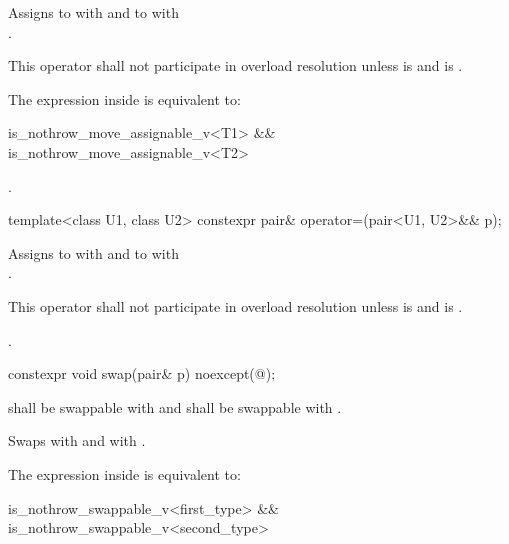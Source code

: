 \begin{itemdescr}
\pnum
\effects
Assigns to  with 
and to  with\\ .

\pnum
\remarks This operator shall not participate in overload resolution unless
 is 
and  is .

\pnum
\remarks The expression inside  is equivalent to:
\begin{codeblock}
is_nothrow_move_assignable_v<T1> && is_nothrow_move_assignable_v<T2>
\end{codeblock}

\pnum
\returns {}.
\end{itemdescr}

%
\begin{itemdecl}
template<class U1, class U2> constexpr pair& operator=(pair<U1, U2>&& p);
\end{itemdecl}

\begin{itemdescr}
\pnum
\effects
Assigns to  with 
and to  with\\ .

\pnum
\remarks This operator shall not participate in overload resolution unless
 is 
and  is .

\pnum
\returns {}.
\end{itemdescr}

%
\begin{itemdecl}
constexpr void swap(pair& p) noexcept(@\seebelow@);
\end{itemdecl}

\begin{itemdescr}
\pnum
\requires
{} shall be swappable with
 and  shall be swappable with .

\pnum
\effects Swaps
 with  and
 with .

\pnum
\remarks The expression inside  is equivalent to:
\begin{codeblock}
is_nothrow_swappable_v<first_type> && is_nothrow_swappable_v<second_type>
\end{codeblock}
\end{itemdescr}

